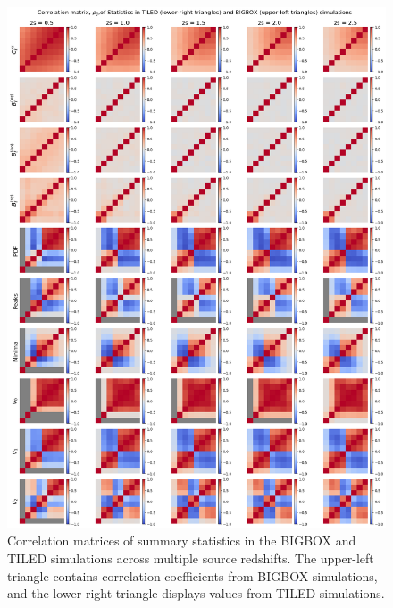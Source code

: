 \begin{figure}[p]
    \centering
    \includegraphics[width=\textwidth]{figures/results/corr_main.png}
    \caption[Correlation Matrices of summary statistics in BIGBOX and TILED Simulations]{Correlation matrices of summary statistics in the BIGBOX and TILED simulations across multiple source redshifts. The upper-left triangle contains correlation coefficients from BIGBOX simulations, and the lower-right triangle displays values from TILED simulations.}
    \label{fig:corr_main}
\end{figure}

